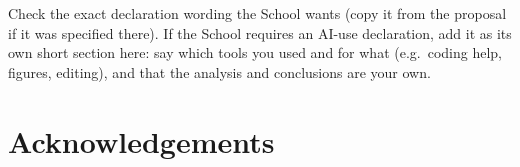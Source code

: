 \begin{guide}
Check the exact declaration wording the School wants (copy it from the proposal if it was specified there). If the School requires an AI-use declaration, add it as its own short section here: say which tools you used and for what (e.g.\ coding help, figures, editing), and that the analysis and conclusions are your own.
\end{guide}

\chapter*{Acknowledgements}

